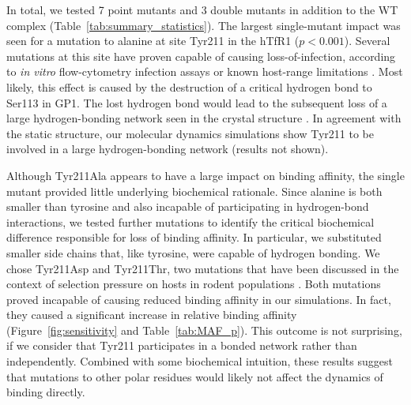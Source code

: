 \documentclass[12pt]{article}
\begin{document}
In total, we tested 7 point mutants and 3 double mutants in addition to the WT complex (Table~\ref{tab:summary_statistics}). The largest single-mutant impact was seen for a mutation to alanine at site Tyr211 in the hTfR1 ($ p < 0.001 $).  Several mutations at this site have proven capable of causing loss-of-infection, according to \textit{in vitro} flow-cytometry infection assays or known host-range limitations \citep{Rad2008,Rad20111,Rad20112}. Most likely, this effect is caused by the destruction of a critical hydrogen bond to Ser113 in GP1. The lost hydrogen bond would lead to the subsequent loss of a large hydrogen-bonding network seen in the crystal structure \citep{Abraham2010}. In agreement with the static structure, our molecular dynamics simulations show Tyr211 to be involved in a large hydrogen-bonding network (results not shown). 

Although Tyr211Ala appears to have a large impact on binding affinity, the single mutant provided little underlying biochemical rationale. Since alanine is both smaller than tyrosine and also incapable of participating in hydrogen-bond interactions, we tested further mutations to identify the critical biochemical difference responsible for loss of binding affinity. In particular, we substituted smaller side chains that, like tyrosine, were capable of hydrogen bonding. We chose Tyr211Asp and Tyr211Thr, two mutations that have been discussed in the context of selection pressure on hosts in rodent populations \citep{Rad2008,Rad20111,Rad20112}. Both mutations proved incapable of causing reduced binding affinity in our simulations. In fact, they caused a significant increase in relative binding affinity (Figure~\ref{fig:sensitivity} and Table~\ref{tab:MAF_p}). This outcome is not surprising, if we consider that Tyr211 participates in a bonded network rather than independently. Combined with some biochemical intuition, these results suggest that mutations to other polar residues would likely not affect the dynamics of binding directly.
\end{document}
